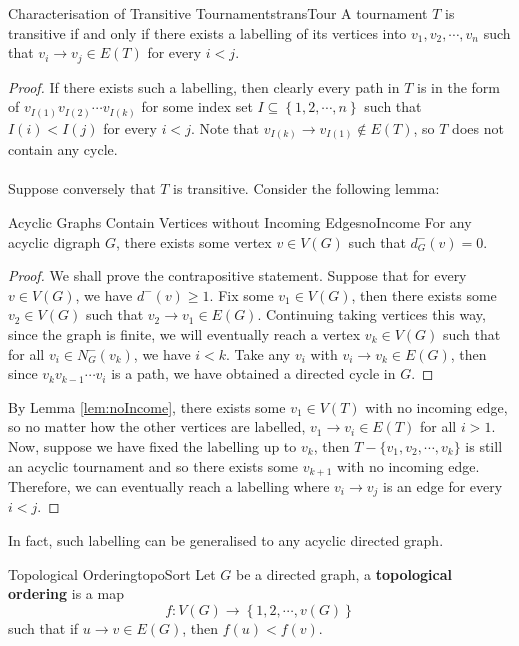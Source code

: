 \documentclass[math, code]{amznotes}
\theoremstyle{remark}
\begin{document}
\begin{probox}{Characterisation of Transitive Tournaments}{transTour}
    A tournament $T$ is transitive if and only if there exists a labelling of its vertices into $v_1, v_2, \cdots, v_n$ such that $v_i \to v_j \in E(T)$ for every $i < j$.
    \tcblower
    \begin{proof}
        If there exists such a labelling, then clearly every path in $T$ is in the form of $v_{I(1)}v_{I(2)}\cdots v_{I(k)}$ for some index set $I \subseteq \left\{1, 2, \cdots, n\right\}$ such that $I(i) < I(j)$ for every $i < j$. Note that $v_{I(k)} \to v_{I(1)} \notin E(T)$, so $T$ does not contain any cycle.
        \\\\
        Suppose conversely that $T$ is transitive. Consider the following lemma:
        \begin{lembox}{Acyclic Graphs Contain Vertices without Incoming Edges}{noIncome}
            For any acyclic digraph $G$, there exists some vertex $v \in V(G)$ such that $d^-_G(v) = 0$.
            \tcblower
            \begin{proof}
                We shall prove the contrapositive statement. Suppose that for every $v \in V(G)$, we have $d^-(v) \geq 1$. Fix some $v_1 \in V(G)$, then there exists some $v_2 \in V(G)$ such that $v_2 \to v_1 \in E(G)$. Continuing taking vertices this way, since the graph is finite, we will eventually reach a vertex $v_k \in V(G)$ such that for all $v_i \in N_G^-(v_k)$, we have $i < k$. Take any $v_i$ with $v_i \to v_k \in E(G)$, then since $v_kv_{k - 1}\cdots v_i$ is a path, we have obtained a directed cycle in $G$.
            \end{proof}
        \end{lembox}
        By Lemma \ref{lem:noIncome}, there exists some $v_1 \in V(T)$ with no incoming edge, so no matter how the other vertices are labelled, $v_1 \to v_i \in E(T)$ for all $i > 1$. Now, suppose we have fixed the labelling up to $v_k$, then $T - \{v_1, v_2, \cdots, v_k\}$ is still an acyclic tournament and so there exists some $v_{k + 1}$ with no incoming edge. Therefore, we can eventually reach a labelling where $v_i \to v_j$ is an edge for every $i < j$.
    \end{proof}
\end{probox}
In fact, such labelling can be generalised to any acyclic directed graph.
\begin{dfnbox}{Topological Ordering}{topoSort}
    Let $G$ be a directed graph, a {\color{red} \textbf{topological ordering}} is a map 
    \begin{equation*}
        f \colon V(G) \to \left\{1, 2, \cdots, v(G)\right\}
    \end{equation*}
    such that if $u \to v \in E(G)$, then $f(u) < f(v)$.
\end{dfnbox}
\end{document}
